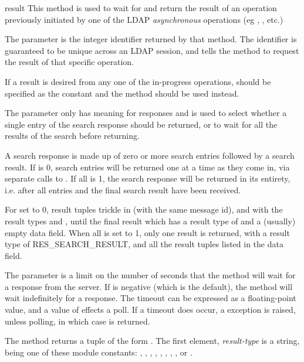 \begin{methoddesc}[LDAPObject]{result}{} %
This method is used to wait for and return the result of an operation
previously initiated by one of the LDAP \emph{asynchronous} operations
(eg , , etc.) 

The  parameter is the integer identifier returned by that
method. 
The identifier is guaranteed to be unique across an LDAP session,
and tells the  method to request the result of that
specific operation.

If a result is desired from any one of the in-progress operations,
 should be specified as the constant 
and the method  should be used instead.

The  parameter only has meaning for  responses
and is used to select whether a single entry of the search
response should be returned, or to wait for all the results
of the search before returning.

A search response is made up of zero or more search entries
followed by a search result. If  is 0, search entries will
be returned one at a time as they come in, via separate calls
to . If all is 1, the search response will be returned
in its entirety, i.e. after all entries and the final search
result have been received.

For  set to 0, result tuples
trickle in (with the same message id), and with the result types
 and ,
until the final result which has a result
type of  and a (usually) empty data field.
When all is set to 1, only one result is returned, with a
result type of RES_SEARCH_RESULT, and all the result tuples
listed in the data field.

The  parameter is a limit on the number of seconds that the
method will wait for a response from the server. 
If  is negative (which is the default),
the method will wait indefinitely for a response.
The timeout can be expressed as a floating-point value, and
a value of  effects a poll.
If a timeout does occur, a  exception is raised,
unless polling, in which case  is returned.

The  method returns a tuple of the form 
.
The first element, \textit{result-type} is a string, being one of
these module constants:
, ,
, , 
, , , 
, or .


\end{methoddesc}
